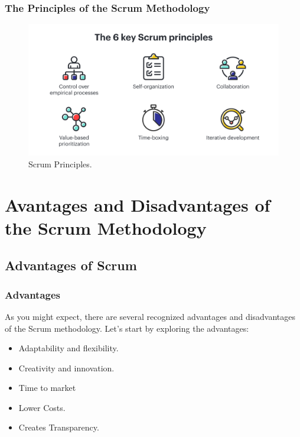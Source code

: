 \documentclass[
	11pt, %
]{beamer}
\begin{document}
\begin{frame}
	\frametitle{The Principles of the Scrum Methodology}
	\begin{figure}
		\includegraphics[width=0.8\linewidth]{principles.png}
		\caption{Scrum Principles.}
	\end{figure}
\end{frame}


\section{Avantages and Disadvantages of the Scrum Methodology}

\subsection{Advantages of Scrum}

\begin{frame}
	\frametitle{Advantages}
	As you might expect, there are several recognized advantages and disadvantages of the Scrum methodology.
	Let's start by exploring the advantages:
	\newline

	\begin{itemize}
		\item Adaptability and flexibility.
		\item Creativity and innovation.
		\item Time to market
		\item Lower Costs.
		\item Creates Transparency.
	\end{itemize}

\end{frame}
\end{document}
